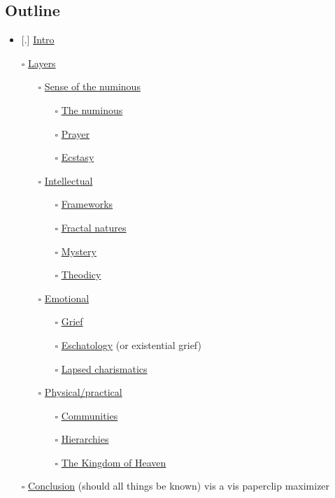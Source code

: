 \hypertarget{outline}{%
\subsection{Outline}\label{outline}}

\begin{itemize}
\tightlist
\item
  {[}.{]} \href{intro}{Intro}
\item[$\square$]
  \href{layers}{Layers}

  \begin{itemize}
  \tightlist
  \item[$\square$]
    \href{section-numinous}{Sense of the numinous}

    \begin{itemize}
    \tightlist
    \item[$\square$]
      \href{numinous}{The numinous}
    \item[$\square$]
      \href{prayer}{Prayer}
    \item[$\square$]
      \href{ecstasy}{Ecstasy}
    \end{itemize}
  \item[$\square$]
    \href{section-intellectual}{Intellectual}

    \begin{itemize}
    \tightlist
    \item[$\square$]
      \href{frameworks}{Frameworks}
    \item[$\square$]
      \href{fractal}{Fractal natures}
    \item[$\square$]
      \href{mystery}{Mystery}
    \item[$\square$]
      \href{theodicy}{Theodicy}
    \end{itemize}
  \item[$\square$]
    \href{section-emotional}{Emotional}

    \begin{itemize}
    \tightlist
    \item[$\square$]
      \href{grief}{Grief}
    \item[$\square$]
      \href{eschatology}{Eschatology} (or existential grief)
    \item[$\square$]
      \href{charismatics}{Lapsed charismatics}
    \end{itemize}
  \item[$\square$]
    \href{section-practical}{Physical/practical}

    \begin{itemize}
    \tightlist
    \item[$\square$]
      \href{communities}{Communities}
    \item[$\square$]
      \href{hierarchies}{Hierarchies}
    \item[$\square$]
      \href{kingdom}{The Kingdom of Heaven}
    \end{itemize}
  \end{itemize}
\item[$\square$]
  \href{conclusion}{Conclusion} (should all things be known) vis a vis paperclip maximizer
\end{itemize}
